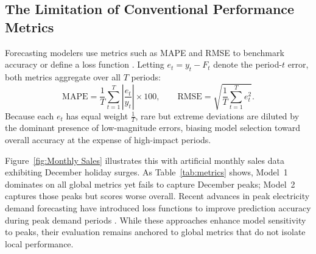 \documentclass[12pt]{article}
\begin{document}

\subsection{The Limitation of Conventional Performance Metrics}
Forecasting modelers use metrics such as MAPE and RMSE to benchmark accuracy or define a loss function \citep{petropoulos2022}. Letting $e_t = y_t - F_t$ denote the period-$t$ error, both metrics aggregate over all $T$ periods:
\begin{equation}
\text{MAPE} = \frac{1}{T} \sum_{t=1}^{T} \left| \frac{e_t}{y_t} \right| \times 100,
\qquad
\text{RMSE} = \sqrt{\frac{1}{T} \sum_{t=1}^{T} e_t^2}.
\end{equation}
Because each $e_t$ %
has equal weight $\frac{1}{T}$, rare but extreme deviations are diluted by the dominant presence of low-magnitude errors, biasing model selection toward overall accuracy at the expense of high-impact periods.

Figure~\ref{fig:Monthly Sales} illustrates this with artificial monthly sales data exhibiting December holiday surges. As Table~\ref{tab:metrics} shows, Model~1 dominates on all global metrics yet fails to capture December peaks; Model~2 captures those peaks but scores worse overall. Recent advances in peak electricity demand forecasting have introduced loss functions to improve prediction accuracy during peak demand periods \citep{nygard2025}. While these approaches enhance model sensitivity to peaks, their evaluation remains anchored to global metrics that do not isolate local performance.
\end{document}
